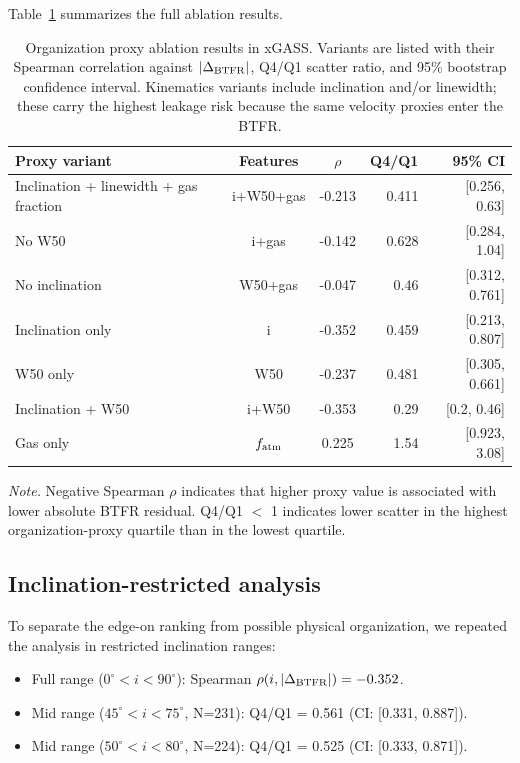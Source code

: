 \documentclass[11pt]{article}
\begin{document}
Table~\ref{tab:ablation} summarizes the full ablation results.

\begin{table}[H]
\centering
\caption{Organization proxy ablation results in xGASS. Variants are listed with their Spearman correlation against $|\Delta_{\rm BTFR}|$, Q4/Q1 scatter ratio, and 95\% bootstrap confidence interval. Kinematics variants include inclination and/or linewidth; these carry the highest leakage risk because the same velocity proxies enter the BTFR.}
\label{tab:ablation}
\begin{tabular}{lccrr}
\toprule
Proxy variant & Features & $\rho$ & Q4/Q1 & 95\% CI \\\midrule
Inclination + linewidth + gas fraction & i+W50+gas & -0.213 & 0.411 & [0.256, 0.63] \\No W50 & i+gas & -0.142 & 0.628 & [0.284, 1.04] \\No inclination & W50+gas & -0.047 & 0.46 & [0.312, 0.761] \\Inclination only & i & -0.352 & 0.459 & [0.213, 0.807] \\W50 only & W50 & -0.237 & 0.481 & [0.305, 0.661] \\Inclination + W50 & i+W50 & -0.353 & 0.29 & [0.2, 0.46] \\Gas only & $f_{\rm atm}$ & 0.225 & 1.54 & [0.923, 3.08] \\\bottomrule
\end{tabular}

\smallskip
\noindent{}\textit{Note.} Negative Spearman $\rho$ indicates that higher proxy value is associated with lower absolute BTFR residual. Q4/Q1 $<$ 1 indicates lower scatter in the highest organization-proxy quartile than in the lowest quartile.
\end{table}

\subsection{Inclination-restricted analysis}

To separate the edge-on ranking from possible physical organization, we repeated the analysis in restricted inclination ranges:

\begin{itemize}
\item Full range ($0^\circ < i < 90^\circ$): Spearman $\rho(i, |\Delta_{\rm BTFR}|) = -0.352$.
\item Mid range ($45^\circ < i < 75^\circ$, N=231): Q4/Q1 = 0.561 (CI: [0.331, 0.887]).
\item Mid range ($50^\circ < i < 80^\circ$, N=224): Q4/Q1 = 0.525 (CI: [0.333, 0.871]).
\end{itemize}
\end{document}
